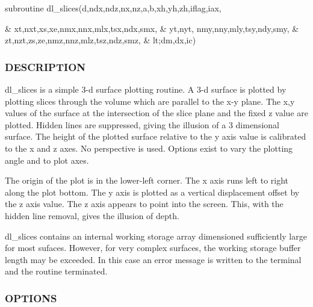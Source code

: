 subroutine dl\+\_\+slices(d,ndx,ndz,nx,nz,a,b,xh,yh,zh,iflag,iax, \begin{DoxyVerb}               & xt,nxt,xs,xe,nmx,nnx,mlx,tsx,ndx,smx,
               & yt,nyt,      nmy,nny,mly,tsy,ndy,smy,
               & zt,nzt,zs,ze,nmz,nnz,mlz,tsz,ndz,smz,
               & lt;dm,dx,ic)
\end{DoxyVerb}


\subsubsection*{D\+E\+S\+C\+R\+I\+P\+T\+I\+ON}

dl\+\_\+slices is a simple 3-\/d surface plotting routine. A 3-\/d surface is plotted by plotting slices through the volume which are parallel to the x-\/y plane. The x,y values of the surface at the intersection of the slice plane and the fixed z value are plotted. Hidden lines are suppressed, giving the illusion of a 3 dimensional surface. The height of the plotted surface relative to the y axis value is calibrated to the x and z axes. No perspective is used. Options exist to vary the plotting angle and to plot axes.

The origin of the plot is in the lower-\/left corner. The x axis runs left to right along the plot bottom. The y axis is plotted as a vertical displacement offset by the z axis value. The z axis appears to point into the screen. This, with the hidden line removal, gives the illusion of depth.

dl\+\_\+slices contains an internal working storage array dimensioned sufficiently large for most sufaces. However, for very complex surfaces, the working storage buffer length may be exceeded. In this case an error message is written to the terminal and the routine terminated.

\subsubsection*{O\+P\+T\+I\+O\+NS}

